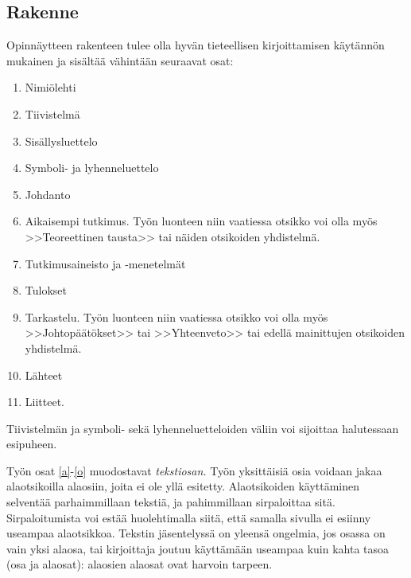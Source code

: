 \documentclass[english,12pt,a4paper,pdftex,elec,utf8]{aaltothesis}
\begin{document}
\subsection*{Rakenne}

Opinn\"aytteen rakenteen tulee olla hyv\"an tieteellisen
kirjoittamisen k\"ayt\"ann\"on mukainen ja sis\"alt\"a\"a v\"ahint\"a\"an seuraavat
osat:

\begin{enumerate}
\item Nimi\"olehti
\item Tiivistelm\"a
\item Sis\"allysluettelo
\item Symboli- ja lyhenneluettelo
\item \label{a} Johdanto
\item  Aikaisempi tutkimus. Ty\"on luonteen niin vaatiessa otsikko voi olla my\"os
        >>Teoreettinen tausta>>  tai n\"aiden otsikoiden yhdistelm\"a.
\item Tutkimusaineisto ja -menetelm\"at %
\item Tulokset
\item \label{o} Tarkastelu. Ty\"on luonteen niin vaatiessa otsikko voi
      olla my\"os >>Johtop\"a\"at\"okset>> tai >>Yhteenveto>>
      tai edell\"a mainittujen otsikoiden yhdistelm\"a.
\item L\"ahteet
\item Liitteet.
\end{enumerate}

Tiivistelm\"an ja symboli- sek\"a lyhenneluetteloiden
v\"aliin voi sijoittaa halutessaan esipuheen.

Ty\"on osat \ref{a}-\ref{o} muodostavat \textit{tekstiosan.}  Ty\"on
yksitt\"aisi\"a osia voidaan jakaa alaotsikoilla alaosiin, joita ei ole
yll\"a esitetty. Alaotsikoiden k\"aytt\"aminen selvent\"a\"a parhaimmillaan
teksti\"a, ja pahimmillaan sirpaloittaa sit\"a.  Sirpaloitumista voi est\"a\"a
huolehtimalla siit\"a, ett\"a samalla sivulla ei esiinny useampaa
alaotsikkoa.  Tekstin j\"asentelyss\"a on yleens\"a ongelmia, jos osassa on
vain yksi alaosa, tai kirjoittaja joutuu k\"aytt\"am\"a\"an useampaa kuin
kahta tasoa (osa ja alaosat): alaosien alaosat ovat harvoin tarpeen.
\end{document}
